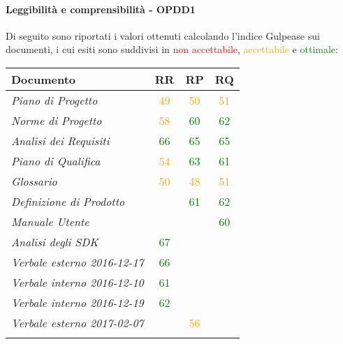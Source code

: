 \documentclass[PdQ.tex]{subfiles}
\begin{document}
		\paragraph{Leggibilità e comprensibilità - OPDD1}
				Di seguito sono riportati i valori ottenuti calcolando l'indice Gulpease sui documenti, i cui esiti sono suddivisi in \textcolor{red}{non accettabile}, \textcolor{orange}{accettabile} e \textcolor{green}{ottimale}:
				\begin{table}[h]
				\centering
				\begin{tabular}{l c c c}
					\hline
					\rule[-0.3cm]{0cm}{0.8cm}
					\textbf{Documento} & \textbf{RR} & \textbf{RP} & \textbf{RQ}\\
					\hline
					\rule[0cm]{0cm}{0.4cm}
					\textit{Piano di Progetto} & \textcolor{orange}{49} & \textcolor{orange}{50} & \textcolor{orange}{51} \\
					\rule[0cm]{0cm}{0.4cm}
					\textit{Norme di Progetto}& \textcolor{orange}{58} & \textcolor{green}{60} & \textcolor{green}{62} \\
					\rule[0cm]{0cm}{0.4cm}
					\textit{Analisi dei Requisiti} & \textcolor{green}{66} & \textcolor{green}{65} & \textcolor{green}{65} \\
					\rule[0cm]{0cm}{0.4cm}
					\textit{Piano di Qualifica} & \textcolor{orange}{54} & \textcolor{green}{63} & \textcolor{green}{61} \\
					\rule[0cm]{0cm}{0.4cm}
					\textit{Glossario} & \textcolor{orange}{50} & \textcolor{orange}{48} & \textcolor{orange}{51}\\
					\rule[0cm]{0cm}{0.4cm}
					\textit{Definizione di Prodotto} & & \textcolor{green}{61} & \textcolor{green}{62} \\
					\rule[0cm]{0cm}{0.4cm}
					\textit{Manuale Utente} & & & \textcolor{green}{60} \\
					\rule[0cm]{0cm}{0.4cm}
					\textit{Analisi degli SDK} & \textcolor{green}{67} & &  \\
					\rule[0cm]{0cm}{0.4cm}
					\textit{Verbale esterno 2016-12-17} & \textcolor{green}{66} & & \\
					\rule[0cm]{0cm}{0.4cm}
					\textit{Verbale interno 2016-12-10} & \textcolor{green}{61} & & \\
					\rule[0cm]{0cm}{0.4cm}
					\textit{Verbale interno 2016-12-19} & \textcolor{green}{62} & & \\
					\rule[0cm]{0cm}{0.4cm}
					\textit{Verbale esterno 2017-02-07} & & \textcolor{orange}{56} & \\
					\rule[0cm]{0cm}{0.4cm}

\end{tabular}
\end{table}
\end{document}
